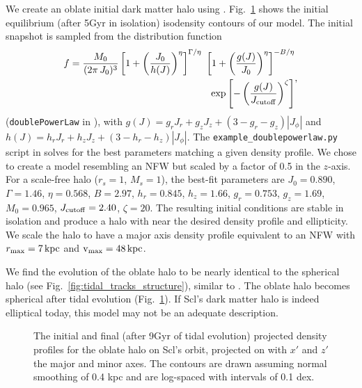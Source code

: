 We create an oblate initial dark matter halo using \agama{}.
Fig.~\ref{fig:oblate_i_f} shows the initial equilibrium (after 5Gyr in
isolation) isodensity contours of our model. The initial snapshot is
sampled from the distribution function \begin{equation}{
\begin{split}
f = \frac{M_0}{(2\pi\,J_0)^3} \left[1 + \left(\frac{J_0}{h(J)}\right)^\eta\right]^{\Gamma / \eta} \ \left[1 + \left(\frac{g(J)}{J_0}\right)^\eta\right]^{-B/\eta} \\ \ \exp\left[-\left(\frac{g(J)}{J_{\rm cutoff}} \right)^\zeta\right] 
\end{split},
}\end{equation} (\texttt{doublePowerLaw} in \agama{}), with
\(g(J) = g_r J_r + g_z J_z + (3-g_r - g_z) |J_\phi|\) and
\(h(J) = h_rJ_r + h_zJ_z + (3-h_r-h_z) |J_\phi|\). The
\texttt{example\_doublepowerlaw.py} script in \agama{} solves for the
best parameters matching a given density profile. We chose to create a
model resembling an NFW but scaled by a factor of 0.5 in the \(z\)-axis.
For a scale-free halo (\(r_s=1\), \(M_s=1\)), the best-fit parameters
are \(J_0=0.890\), \(\Gamma=1.46\), \(\eta=0.568\), \(B=2.97\),
\(h_r=0.845\), \(h_z=1.66\), \(g_r=0.753\), \(g_z=1.69\), \(M_0=0.965\),
\(J_{\rm cutoff}=2.40\), \(\zeta=20\). The resulting initial conditions
are stable in isolation and produce a halo with near the desired density
profile and ellipticity. We scale the halo to have a major axis density
profile equivalent to an NFW with \(r_{\rm max} = 7\,{\rm kpc}\) and
\({\rm v}_{\rm max}=48\,{\rm kpc}\).

We find the evolution of the oblate halo to be nearly identical to the
spherical halo (see Fig.~\ref{fig:tidal_tracks_structure}), similar to
\citet{battaglia+sollima+nipoti2015}. The oblate halo becomes spherical
after tidal evolution (Fig.~\ref{fig:oblate_i_f}). If Scl's dark matter
halo is indeed elliptical today, this model may not be an adequate
description.

\begin{figure}
\centering
{}
\caption[Oblate halo projected density snapshots]{The initial and final
(after 9Gyr of tidal evolution) projected density profiles for the
oblate halo on Scl's \smallperi{} orbit, projected on with \(x'\) and
\(z'\) the major and minor axes. The contours are drawn assuming normal
smoothing of 0.4 kpc and are log-spaced with intervals of 0.1
dex.}\label{fig:oblate_i_f}
\end{figure}

